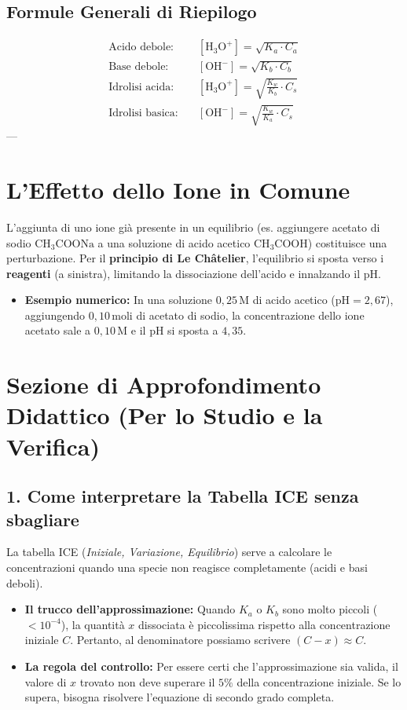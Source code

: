 \documentclass[11pt, a4paper, openright]{book}
\begin{document}
\subsection{Formule Generali di Riepilogo}
\begin{align}
\text{Acido debole:} \quad & [\text{H}_3\text{O}^+] = \sqrt{K_a \cdot C_a} \\
\text{Base debole:} \quad & [\text{OH}^-] = \sqrt{K_b \cdot C_b} \\
\text{Idrolisi acida:} \quad & [\text{H}_3\text{O}^+] = \sqrt{\frac{K_w}{K_b} \cdot C_s} \\
\text{Idrolisi basica:} \quad & [\text{OH}^-] = \sqrt{\frac{K_w}{K_a} \cdot C_s}
\end{align}
---

\section{L'Effetto dello Ione in Comune}
L'aggiunta di uno ione già presente in un equilibrio (es. aggiungere acetato di sodio $\text{CH}_3\text{COONa}$ a una soluzione di acido acetico $\text{CH}_3\text{COOH}$) costituisce una perturbazione. Per il \textbf{principio di Le Châtelier}, l'equilibrio si sposta verso i \textbf{reagenti} (a sinistra), limitando la dissociazione dell'acido e innalzando il pH.
\begin{itemize}
    \item \textbf{Esempio numerico:} In una soluzione $0{,}25 \, \text{M}$ di acido acetico ($\text{pH} = 2{,}67$), aggiungendo $0{,}10 \, \text{moli}$ di acetato di sodio, la concentrazione dello ione acetato sale a $0{,}10 \, \text{M}$ e il pH si sposta a $4{,}35$.
\end{itemize}

\section{Sezione di Approfondimento Didattico (Per lo Studio e la Verifica)}
\subsection{1. Come interpretare la Tabella ICE senza sbagliare}
La tabella ICE (\textit{Iniziale, Variazione, Equilibrio}) serve a calcolare le concentrazioni quando una specie non reagisce completamente (acidi e basi deboli). 
\begin{itemize}
    \item \textbf{Il trucco dell'approssimazione:} Quando $K_a$ o $K_b$ sono molto piccoli ($< 10^{-4}$), la quantità $x$ dissociata è piccolissima rispetto alla concentrazione iniziale $C$. Pertanto, al denominatore possiamo scrivere $(C - x) \approx C$. 
    \item \textbf{La regola del controllo:} Per essere certi che l'approssimazione sia valida, il valore di $x$ trovato non deve superare il $5\%$ della concentrazione iniziale. Se lo supera, bisogna risolvere l'equazione di secondo grado completa.
\end{itemize}
\end{document}
